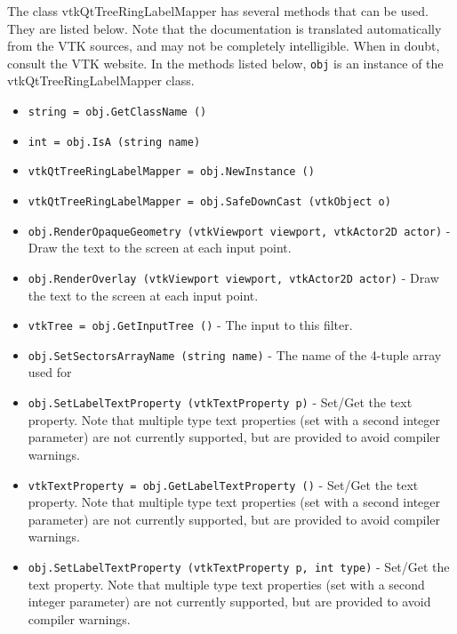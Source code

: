 The class vtkQtTreeRingLabelMapper has several methods that can be used.
  They are listed below.
Note that the documentation is translated automatically from the VTK sources,
and may not be completely intelligible.  When in doubt, consult the VTK website.
In the methods listed below, \verb|obj| is an instance of the vtkQtTreeRingLabelMapper class.
\begin{itemize}
\item  \verb|string = obj.GetClassName ()|

\item  \verb|int = obj.IsA (string name)|

\item  \verb|vtkQtTreeRingLabelMapper = obj.NewInstance ()|

\item  \verb|vtkQtTreeRingLabelMapper = obj.SafeDownCast (vtkObject o)|

\item  \verb|obj.RenderOpaqueGeometry (vtkViewport viewport, vtkActor2D actor)| -  Draw the text to the screen at each input point.

\item  \verb|obj.RenderOverlay (vtkViewport viewport, vtkActor2D actor)| -  Draw the text to the screen at each input point.

\item  \verb|vtkTree = obj.GetInputTree ()| -  The input to this filter.

\item  \verb|obj.SetSectorsArrayName (string name)| -  The name of the 4-tuple array used for

\item  \verb|obj.SetLabelTextProperty (vtkTextProperty p)| -  Set/Get the text property. Note that multiple type text properties
 (set with a second integer parameter) are not currently supported,
 but are provided to avoid compiler warnings.

\item  \verb|vtkTextProperty = obj.GetLabelTextProperty ()| -  Set/Get the text property. Note that multiple type text properties
 (set with a second integer parameter) are not currently supported,
 but are provided to avoid compiler warnings.

\item  \verb|obj.SetLabelTextProperty (vtkTextProperty p, int type)| -  Set/Get the text property. Note that multiple type text properties
 (set with a second integer parameter) are not currently supported,
 but are provided to avoid compiler warnings.


\end{itemize}
